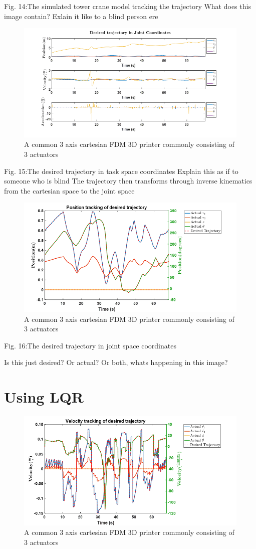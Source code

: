 \documentclass{UoNMCHA}
\numberwithin{equation}{section}
\begin{document}
Fig. 14:The simulated tower crane model tracking the trajectory
What does this image contain? Exlain it like to a blind person ere

\begin{figure}[H]
	\begin{center}
		\includegraphics[width=.5\linewidth]{figs/Picture26}
		\caption{A  common 3 axis cartesian FDM 3D printer commonly consisting of 3 actuators}
		\label{figs/Picture26}
	\end{center}
\end{figure}

Fig. 15:The desired trajectory in task space coordinates
Explain this as if to someone who is blind
The trajectory then transforms through inverse kinematics from the cartesian space to the joint space

\begin{figure}[H]
	\begin{center}
		\includegraphics[width=.5\linewidth]{figs/Picture27}
		\caption{A  common 3 axis cartesian FDM 3D printer commonly consisting of 3 actuators}
		\label{figs/Picture27}
	\end{center}
\end{figure}

Fig. 16:The desired trajectory in joint space coordinates

Is this just desired? Or actual? Or both, whats happening in this image?


\section{Using LQR} 

\begin{figure}[H]
	\begin{center}
		\includegraphics[width=.5\linewidth]{figs/Picture28}
		\caption{A  common 3 axis cartesian FDM 3D printer commonly consisting of 3 actuators}
		\label{figs/Picture28}
	\end{center}
\end{figure}
\end{document}

